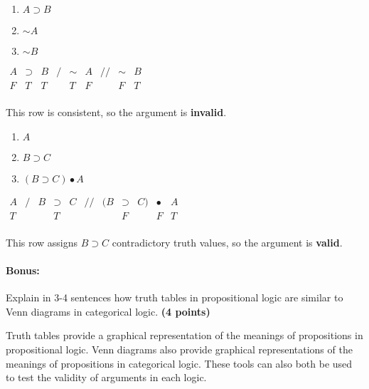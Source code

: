 \documentclass[10pt]{article}
\begin{document}
\begin{enumerate}
\begin{multicols}{2}
  \item \begin{enumerate}[(1)]
         \item $A \supset B$
         \item \underline{$\sim\! A$\hspace{1cm}}
         \item $\sim\! B$
        \end{enumerate}
        
 $\begin{array}{ccccccccc}
  A & \supset & B & / & \sim & A & // & \sim & B \\ \hline
  F & T & T &  & T & F &  & F & T \\
 \end{array}$
 
 This row is consistent, so the argument is \textbf{invalid}.
 
 \columnbreak
  
  \item \begin{enumerate}[(1)]
         \item $A$
         \item \underline{$B \supset C$\hspace{1cm}}
         \item $(B \supset C) \bullet A$
        \end{enumerate}
        
  $\begin{array}{ccccccccccc}
  A & / & B & \supset & C & // & (B & \supset & C) & \bullet & A \\ \hline
  T & & & T & & & & F & & F & T \\
 \end{array}$
 
 This row assigns $B\supset C$ contradictory truth values, so the argument is \textbf{valid}.
 
\end{multicols}   
\end{enumerate}
  
\paragraph{Bonus:}  Explain in 3-4 sentences how truth tables in propositional logic are similar to Venn diagrams in categorical logic. \textbf{(4 points)}

Truth tables provide a graphical representation of the meanings of propositions in propositional logic. Venn diagrams also provide graphical representations of the meanings of propositions in categorical logic.  These tools can also both be used to test the validity of arguments in each logic.
\end{document}
